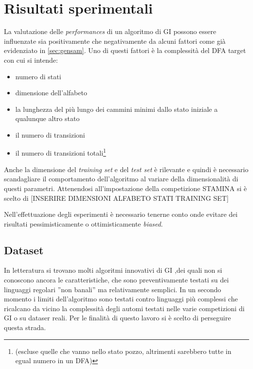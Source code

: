 
\chapter{Risultati sperimentali} %
\label{cap:sette}
La valutazione delle \textit{performances} di un algoritmo di \ac{GI} possono essere influenzate sia positivamente che negativamente da alcuni fattori come già evidenziato in \ref{sec:gensam}. Uno di questi fattori è la complessità del \ac{DFA} target con cui si intende\cite{Stamina10}:
\begin{itemize}
\item numero di stati
\item dimensione dell'alfabeto
\item la lunghezza del più lungo dei cammini minimi dallo stato iniziale a qualunque altro stato
\item il numero di transizioni
\item il numero di transizioni totali\footnote{ (escluse quelle che vanno nello stato pozzo, altrimenti sarebbero tutte in egual numero in un \ac{DFA})}
\end{itemize}
Anche la dimensione del \textit{training set} e del \textit{test set} è rilevante e quindi è necessario scandagliare il comportamento dell'algoritmo al variare della dimensionalità di questi parametri. Attenendosi all'impostazione della competizione STAMINA \cite{Stamina10} si è scelto di [INSERIRE DIMENSIONI ALFABETO STATI TRAINING SET]

Nell'effettuazione degli esperimenti è necessario tenerne conto onde evitare dei risultati pessimisticamente o ottimisticamente \textit{biased}. 

\section{Dataset}
In letteratura si trovano molti algoritmi innovativi di \ac{GI} ,dei quali non si conoscono ancora le caratteristiche, che sono preventivamente testati su dei linguaggi regolari ''non banali'' ma relativamente semplici. In un secondo momento i limiti dell'algoritmo sono testati contro linguaggi più complessi che ricalcano da vicino la complessità degli automi testati nelle varie competizioni di \ac{GI} o su dataser reali. Per le finalità di questo lavoro si è scelto di perseguire questa strada.

